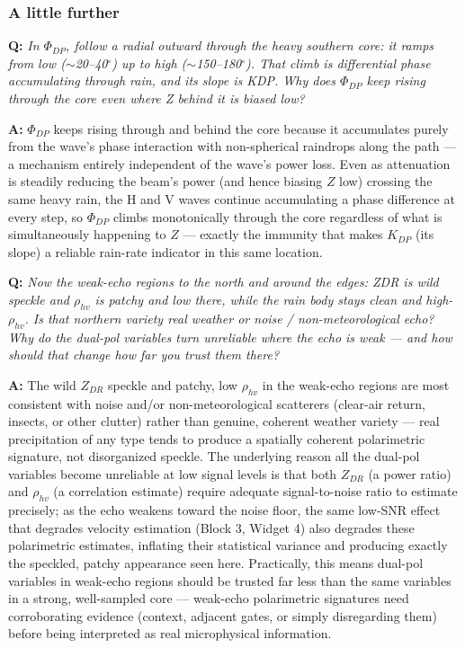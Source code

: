 \documentclass[11pt]{article}
\newenvironment{qa}[1]{\par\noindent\textbf{\color{qgray}Q: }\emph{#1}\par\noindent\textbf{A: }}{\par\vspace{6pt}}
\newcommand{\tier}[1]{\subsubsection*{#1}}
\begin{document}
\tier{A little further}
\begin{qa}{In $\Phi_{DP}$, follow a radial outward through the heavy southern core: it ramps from low ($\sim$20--40$^\circ$) up to high ($\sim$150--180$^\circ$). That climb is differential phase accumulating through rain, and its slope is KDP. Why does $\Phi_{DP}$ keep rising through the core even where Z behind it is biased low?}
$\Phi_{DP}$ keeps rising through and behind the core because it accumulates purely from the wave's phase interaction with non-spherical raindrops along the path --- a mechanism entirely independent of the wave's power loss. Even as attenuation is steadily reducing the beam's power (and hence biasing $Z$ low) crossing the same heavy rain, the H and V waves continue accumulating a phase difference at every step, so $\Phi_{DP}$ climbs monotonically through the core regardless of what is simultaneously happening to $Z$ --- exactly the immunity that makes $K_{DP}$ (its slope) a reliable rain-rate indicator in this same location.
\end{qa}
\begin{qa}{Now the weak-echo regions to the north and around the edges: ZDR is wild speckle and $\rho_{hv}$ is patchy and low there, while the rain body stays clean and high-$\rho_{hv}$. Is that northern variety real weather or noise / non-meteorological echo? Why do the dual-pol variables turn unreliable where the echo is weak --- and how should that change how far you trust them there?}
The wild $Z_{DR}$ speckle and patchy, low $\rho_{hv}$ in the weak-echo regions are most consistent with noise and/or non-meteorological scatterers (clear-air return, insects, or other clutter) rather than genuine, coherent weather variety --- real precipitation of any type tends to produce a spatially coherent polarimetric signature, not disorganized speckle. The underlying reason all the dual-pol variables become unreliable at low signal levels is that both $Z_{DR}$ (a power ratio) and $\rho_{hv}$ (a correlation estimate) require adequate signal-to-noise ratio to estimate precisely; as the echo weakens toward the noise floor, the same low-SNR effect that degrades velocity estimation (Block 3, Widget 4) also degrades these polarimetric estimates, inflating their statistical variance and producing exactly the speckled, patchy appearance seen here. Practically, this means dual-pol variables in weak-echo regions should be trusted far less than the same variables in a strong, well-sampled core --- weak-echo polarimetric signatures need corroborating evidence (context, adjacent gates, or simply disregarding them) before being interpreted as real microphysical information.
\end{qa}
\end{document}
